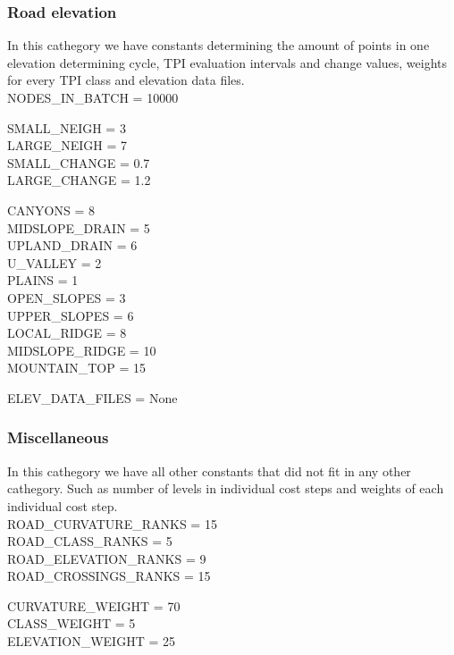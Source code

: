 \documentclass[oneside]{article}
\begin{document}
            \subsubsection{Road elevation}
            In this cathegory we have constants determining the amount of points in one elevation determining cycle, TPI evaluation intervals and change values, weights for every TPI class and elevation data files.\\
            NODES\_IN\_BATCH = 10000

            \vspace{5mm}

            \noindent SMALL\_NEIGH = 3\\
            LARGE\_NEIGH = 7\\
            SMALL\_CHANGE = 0.7\\
            LARGE\_CHANGE = 1.2

            \vspace{5mm}

            \noindent CANYONS = 8\\
            MIDSLOPE\_DRAIN = 5\\
            UPLAND\_DRAIN = 6\\
            U\_VALLEY = 2\\
            PLAINS = 1\\
            OPEN\_SLOPES = 3\\
            UPPER\_SLOPES = 6\\
            LOCAL\_RIDGE = 8\\
            MIDSLOPE\_RIDGE = 10\\
            MOUNTAIN\_TOP = 15

            \vspace{5mm}

            \noindent ELEV\_DATA\_FILES = None

            \subsubsection{Miscellaneous}
            In this cathegory we have all other constants that did not fit in any other cathegory. Such as number of levels in individual cost steps and weights of each individual cost step.\\
            ROAD\_CURVATURE\_RANKS = 15\\
            ROAD\_CLASS\_RANKS = 5\\
            ROAD\_ELEVATION\_RANKS = 9\\
            ROAD\_CROSSINGS\_RANKS = 15

            \vspace{5mm}

            \noindent CURVATURE\_WEIGHT = 70\\
            CLASS\_WEIGHT = 5\\
            ELEVATION\_WEIGHT = 25
\end{document}
